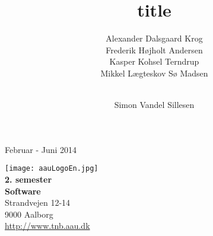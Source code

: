 \author{Alexander Dalsgaard Krog \andnext\\
    Frederik Højholt Andersen \andnext\\
    Kasper Kohsel Terndrup \andnext\\
    Mikkel Lægteskov Sø Madsen \and\\
    Simon Vandel Sillesen}

\title{title}

\begin{titlingpage}

\vspace*{2cm}
     \makebox[\linewidth]{
     }
     \vfill
     \centerline{Februar - Juni 2014}
     \clearpage

\begin{minipage}[t]{0.5\textwidth}
\begin{flushright}
	\texttt{[image: aauLogoEn.jpg]}\\
		\small \textbf{2. semester} \\
		\small \textbf{Software}\\
		\small Strandvejen 12-14 \\
		\small 9000 Aalborg \\
		\small \url{http://www.tnb.aau.dk}\\
		\bigskip
		\fbox{
  		\parbox{\linewidth}{
     		{
     		}
     	}}
\end{flushright}
\end{minipage}
\end{titlingpage}
